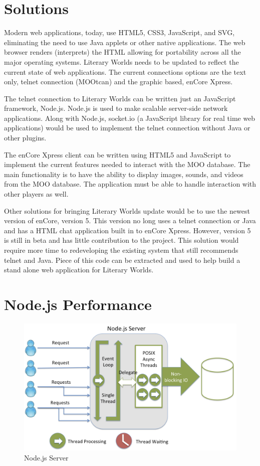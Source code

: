 \documentclass[12pt, letterpaper]{report}
\begin{document}
\section{Solutions}
Modern web applications, today, use HTML5, CSS3, JavaScript, and SVG, eliminating the need to use Java applets or other native applications. The web browser renders (interprets) the HTML allowing for portability across all the major operating systems. Literary Worlds needs to be updated to reflect the current state of web applications. The current connections options are the text only, telnet connection (MOOtcan) and the graphic based, enCore Xpress. 

\par
The telnet connection to Literary Worlds can be written just an JavaScript framework, Node.js.  Node.js is used to make scalable server-side network applications. Along with Node.js, socket.io (a JavaScript library for real time web applications) would be used to implement the telnet connection without Java or other plugins.

\par
The enCore Xpress client can be written using HTML5 and JavaScript to implement the current features needed to interact with the MOO database. The main functionality is to have the ability to display images, sounds, and videos from the MOO database.  The application must be able to handle interaction with other players as well.

\par
Other solutions for bringing Literary Worlds update would be to use the newest version of enCore, version 5.  This version no long uses a telnet connection or Java and has a HTML chat application built in to enCore Xpress.  However, version 5 is still in beta and has little contribution to the project.  This solution would require more time to redeveloping the existing system that still recommends telnet and Java.  Piece of this code can be extracted and used to help build a stand alone web application for Literary Worlds.

\section{Node.js Performance}
\begin{figure}[htp]
\centering
\includegraphics[scale=0.3]{threading_node.png}
\caption{Node.js Server \cite{fullStackJS}}
\label{node1}
\end{figure}
\end{document}
